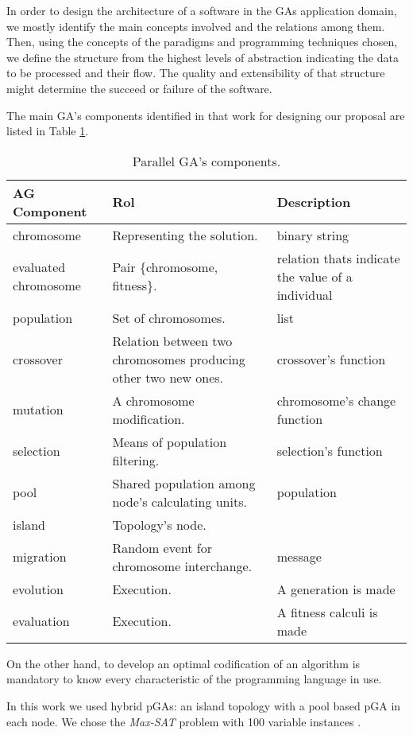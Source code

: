 
In order to design the architecture of a software in the GAs application domain, we mostly identify the main concepts involved and the relations among them. Then, using the concepts of the paradigms and programming techniques chosen, we define the structure from the highest levels of abstraction indicating the data to be processed and their flow. The quality and extensibility of that structure might determine the succeed or failure of the software.

The main GA’s components identified in that work for designing our proposal are listed in Table \ref{agpComp}.

\begin{table}
  \centering
  \caption{Parallel GA's components.}\label{agpComp}
   \begin{tabular}{|>{\centering}p{3cm}|p{5cm}|p{3cm}|}
   \hline
   \textbf{AG Component} & \textbf{Rol} & \textbf{Description} \\
     \hline
      chromosome & Representing the solution. & binary string \\
     \hline
      evaluated chromosome & Pair \{chromosome, fitness\}. & relation thats indicate the value of a individual\\
     \hline
      population & Set of chromosomes. & list \\
     \hline
     crossover & Relation between two chromosomes producing other two new ones. & crossover's function \\
     \hline
      mutation & A chromosome modification. & chromosome's change function \\
     \hline
     selection & Means of population filtering. & selection's function \\
     \hline
      pool & Shared population among node's calculating units. & population \\
     \hline
      island & Topology's node. &  \\
     \hline
      migration & Random event for chromosome interchange. & message \\
     \hline
      evolution & Execution. & A generation is made \\
     \hline
      evaluation & Execution. & A fitness calculi is made \\
     \hline
   \end{tabular}

\end{table}

On the other hand, to develop an optimal codification of an algorithm is mandatory to know every characteristic of the programming language in use.

In this work we used hybrid pGAs: an island topology with a pool based pGA in each node. We chose the {\em Max-SAT} problem with 100 variable instances \cite{Hoos2000}.
